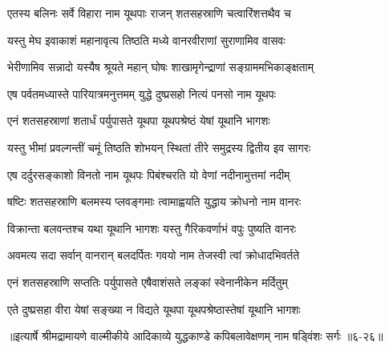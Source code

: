 \twolineshloka
{एतस्य बलिनः सर्वे विहारा नाम यूथपाः}
{राजन् शतसहस्राणि चत्वारिंशत्तथैव च} %

\twolineshloka
{यस्तु मेघ इवाकाशं महानावृत्य तिष्ठति}
{मध्ये वानरवीराणां सुराणामिव वासवः} %

\twolineshloka
{भेरीणामिव सन्नादो यस्यैष श्रूयते महान्}
{घोषः शाखामृगेन्द्राणां सङ्ग्राममभिकाङ्क्षताम्} %

\twolineshloka
{एष पर्वतमध्यास्ते पारियात्रमनुत्तमम्}
{युद्धे दुष्प्रसहो नित्यं पनसो नाम यूथपः} %

\twolineshloka
{एनं शतसहस्राणां शतार्धं पर्युपासते}
{यूथपा यूथपश्रेष्ठं येषां यूथानि भागशः} %

\twolineshloka
{यस्तु भीमां प्रवल्गन्तीं चमूं तिष्ठति शोभयन्}
{स्थितां तीरे समुद्रस्य द्वितीय इव सागरः} %

\twolineshloka
{एष दर्दुरसङ्काशो विनतो नाम यूथपः}
{पिबंश्चरति यो वेणां नदीनामुत्तमां नदीम्} %

\twolineshloka
{षष्टिः शतसहस्राणि बलमस्य प्लवङ्गमाः}
{त्वामाह्वयति युद्धाय क्रोधनो नाम वानरः} %

\twolineshloka
{विक्रान्ता बलवन्तश्च यथा यूथानि भागशः}
{यस्तु गैरिकवर्णाभं वपुः पुष्यति वानरः} %

\twolineshloka
{अवमत्य सदा सर्वान् वानरान् बलदर्पितः}
{गवयो नाम तेजस्वी त्वां क्रोधादभिवर्तते} %

\twolineshloka
{एनं शतसहस्राणि सप्ततिः पर्युपासते}
{एषैवाशंसते लङ्कां स्वेनानीकेन मर्दितुम्} %

\twolineshloka
{एते दुष्प्रसहा वीरा येषां सङ्ख्या न विद्यते}
{यूथपा यूथपश्रेष्ठास्तेषां यूथानि भागशः} %


॥इत्यार्षे श्रीमद्रामायणे वाल्मीकीये आदिकाव्ये युद्धकाण्डे कपिबलावेक्षणम् नाम षड्विंशः सर्गः ॥६-२६॥
